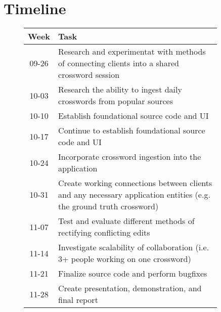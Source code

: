 \documentclass{article}
\begin{document}
\newpage
\section{Timeline}
\label{timeline}
\begin{figure}[h]
  \centering
  \begin{tabular}{| c | p{0.9\linewidth} |}
    \hline
    \textbf{Week} & \textbf{Task} \\ \hline
    09-26 & Research and experimentat with methods of connecting
            clients into a shared crossword session \\ \hline
    10-03 & Research the ability to
            ingest daily crosswords from popular sources \\ \hline
    10-10 & Establish foundational source code and UI \\ \hline
    10-17 & Continue to establish foundational source code and UI \\ \hline
    10-24 & Incorporate crossword ingestion into the application \\ \hline
    10-31 & Create working connections between clients and any
            necessary application entities (e.g. the ground truth crossword) \\ \hline
    11-07 & Test and evaluate different methods of rectifying conflicting edits  \\ \hline
    11-14 & Investigate scalability of collaboration (i.e. 3+ people working on one crossword) \\ \hline
    11-21 & Finalize source code and perform bugfixes \\ \hline
    11-28 & Create presentation, demonstration, and final report \\ \hline

    \end{tabular}
\end{figure}
\end{document}
